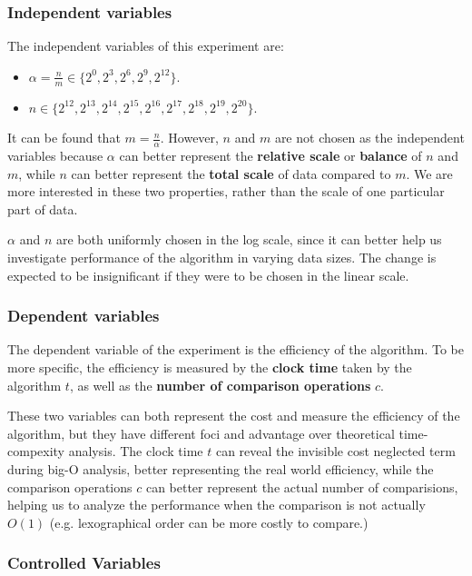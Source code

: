 \documentclass[12pt]{article}
\begin{document}
\subsubsection{Independent variables}

The independent variables of this experiment are:

\begin{itemize}
    \item $\alpha = \frac{n}{m} \in\{2^0, 2^3, 2^6, 2^9, 2^{12}\}$.
    \item $n \in\{2^{12}, 2^{13}, 2^{14}, 2^{15}, 2^{16}, 2^{17}, 2^{18}, 2^{19}, 2^{20}\}$.
\end{itemize}

It can be found that $m = \frac{n}{\alpha}$. However, $n$ and $m$ are not chosen as the independent variables because $\alpha$ can better represent the \textbf{relative scale} or \textbf{balance} of $n$ and $m$, while $n$ can better represent the \textbf{total scale} of data compared to $m$. We are more interested in these two properties, rather than the scale of one particular part of data.

$\alpha$ and $n$ are both uniformly chosen in the log scale, since it can better help us investigate performance of the algorithm in varying data sizes. The change is expected to be insignificant if they were to be chosen in the linear scale.

\subsubsection{Dependent variables}

The dependent variable of the experiment is the efficiency of the algorithm. To be more specific, the efficiency is measured by the \textbf{clock time} taken by the algorithm $t$, as well as the \textbf{number of comparison operations} $c$.

These two variables can both represent the cost and measure the efficiency of the algorithm, but they have different foci and advantage over theoretical time-compexity analysis. The clock time $t$ can reveal the invisible cost neglected term during big-O analysis, better representing the real world efficiency, while the comparison operations $c$ can better represent the actual number of comparisions, helping us to analyze the performance when the comparison is not actually $O(1)$ (e.g. lexographical order can be more costly to compare.)

\subsubsection{Controlled Variables}
\end{document}
